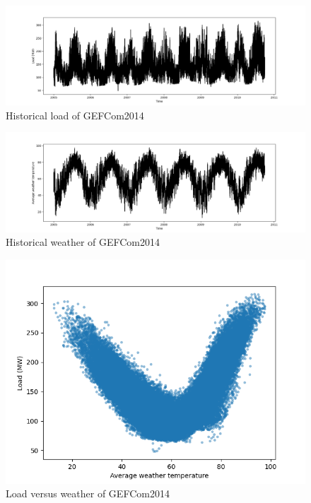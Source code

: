 \begin{figure}[!h]
    \includegraphics[width=\textwidth]{images/gefcom_load_historical.png}
    \caption{Historical load of GEFCom2014}
    \label{fig:gefcom_load_historical}
\end{figure}

\begin{figure}[!h]
    \includegraphics[width=\textwidth]{images/gefcom_w_avg_historical.png}
    \caption{Historical weather of GEFCom2014}
    \label{fig:gefcom_w_avg_historical}
\end{figure}

\begin{figure}[!h]
    \includegraphics[width=\textwidth]{images/gefcom_load_vs_w_avg.png}
    \caption{Load versus weather of GEFCom2014}
    \label{fig:gefcom_load_vs_w_avg}
\end{figure}

